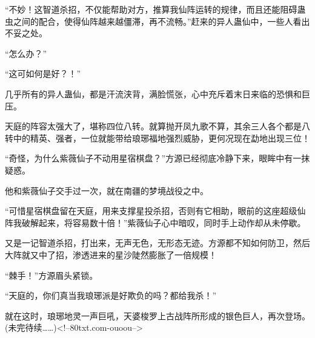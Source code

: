 \begin{this_body}
“不妙！这智道杀招，不仅能帮助对方，推算我仙阵运转的规律，而且还能阻碍蛊虫之间的配合，使得仙阵越来越僵滞，再不流畅。”赶来的异人蛊仙中，一些人看出不妥之处。

“怎么办？”

“这可如何是好？！”

几乎所有的异人蛊仙，都是汗流浃背，满脸慌张，心中充斥着末日来临的恐惧和巨压。

天庭的阵容太强大了，堪称四位八转。就算抛开凤九歌不算，其余三人各个都是八转中的精英、强者，一位就能带给琅琊福地强烈威胁，更何况现在勐地出现三位！

“奇怪，为什么紫薇仙子不动用星宿棋盘？”方源已经彻底冷静下来，眼眸中有一抹疑惑。

他和紫薇仙子交手过一次，就在南疆的梦境战役之中。

“可惜星宿棋盘留在天庭，用来支撑星投杀招，否则有它相助，眼前的这座超级仙阵我破解起来，将容易数十倍！”紫薇仙子心中暗叹，同时手上动作却从未停歇。

又是一记智道杀招，打出来，无声无色，无形态无迹。方源都不知如何防卫，然后大阵就又中了招，渗透进来的星沙陡然膨胀了一倍规模！

“棘手！”方源眉头紧锁。

“天庭的，你们真当我琅琊派是好欺负的吗？都给我杀！”

就在这时，琅琊地灵一声巨吼，天婆梭罗上古战阵所形成的银色巨人，再次登场。(未完待续……)<!--80txt.com-ouoou-->

\end{this_body}

